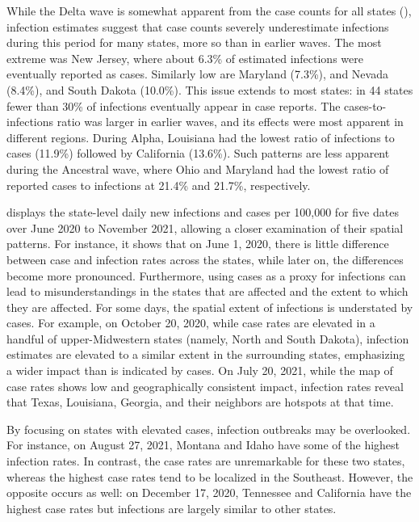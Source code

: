 While the Delta wave is
somewhat apparent from the case counts for all states
(), infection estimates suggest that case counts
severely underestimate infections during this period for many states, more so
than in earlier waves. The most extreme was New Jersey, where about 6.3\% of
estimated infections were eventually reported as cases. Similarly low are
Maryland (7.3\%), and Nevada (8.4\%), and South Dakota (10.0\%). This issue
extends to most states: in 44 states fewer than 30\% of infections eventually
appear in case reports. The cases-to-infections ratio was larger in earlier waves, and
its effects were most apparent in different regions. During Alpha, Louisiana had the
lowest ratio of infections to cases (11.9\%) followed by California (13.6\%).
Such patterns are less apparent during the Ancestral wave, where Ohio and
Maryland had the lowest ratio of reported cases to infections at 21.4\% and
21.7\%, respectively. 

 displays the state-level daily new infections
and cases per 100,000 for five dates over June 2020 to November 2021, allowing a
closer examination of their spatial patterns. For instance, it shows
that on June 1, 2020, there is little difference between case and infection
rates across the states, while later on, the differences become more pronounced.
Furthermore, using cases as a proxy for infections can lead to
misunderstandings in the states that are affected and the extent to which they
are affected. For some days, the spatial extent of infections is understated by
cases. For example, on October 20, 2020, while case rates are elevated in a
handful of upper-Midwestern states (namely, North and South Dakota), infection
estimates are elevated to a similar extent in the surrounding states,
emphasizing a wider impact than is indicated by cases. On July 20, 2021, while
the map of case rates shows low and geographically consistent impact, infection
rates reveal that Texas, Louisiana, Georgia, and their neighbors are hotspots at
that time. 

By focusing on states with elevated cases, infection outbreaks may be
overlooked. For instance, on August 27, 2021, Montana and Idaho have some of the
highest infection rates. In contrast, the case rates are unremarkable for these
two states, whereas the highest case rates tend to be localized in the Southeast. However, the opposite occurs as well: on December
17, 2020, Tennessee and California have the highest case rates but infections
are largely similar to other states.

